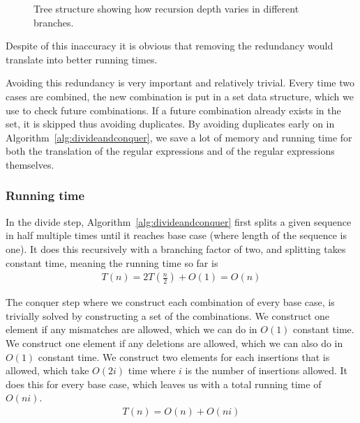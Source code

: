 \documentclass[12pt]{article}
\theoremstyle{definition}
\begin{document}
\begin{figure}[H]
	\centering
	\caption{Tree structure showing how recursion depth varies in different branches.}
	\label{fig:recursion_depth_example}
\end{figure}

Despite of this inaccuracy it is obvious that removing the redundancy would translate into better running times.

Avoiding this redundancy is very important and relatively trivial. Every time two cases are combined, the new combination is put in a set data structure, which we use to check future combinations. If a future combination already exists in the set, it is skipped thus avoiding duplicates. By avoiding duplicates early on in Algorithm~\ref{alg:divideandconquer}, we save a lot of memory and running time for both the translation of the regular expressions and of the regular expressions themselves.

\subsubsection{Running time}

In the divide step, Algorithm~\ref{alg:divideandconquer} first splits a given sequence in half multiple times until it reaches base case (where length of the sequence is one). It does this recursively with a branching factor of two, and splitting takes constant time, meaning the running time so far is 
\begin{eqnarray}
	T(n) = 2T(\frac{n}{2}) + O(1) = O(n)
\end{eqnarray}

The conquer step where we construct each combination of every base case, is trivially solved by constructing a set of the combinations. We construct one element if any mismatches are allowed, which we can do in $O(1)$ constant time. We construct one element if any deletions are allowed, which we can also do in $O(1)$ constant time. We construct two elements for each insertions that is allowed, which take $O(2i)$ time where $i$ is the number of insertions allowed. It does this for every base case, which leaves us with a total running time of $O(ni)$.
\begin{eqnarray}
	T(n) = O(n) + O(ni)
\end{eqnarray}
\end{document}
